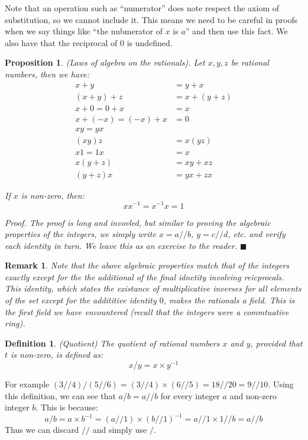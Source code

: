\documentclass{article}
\newtheorem{definition}{Definition}[subsection]
\newtheorem{remark}{Remark}[subsection]
\newtheorem{proposition}{Proposition}[subsection]
\let\it\textit
\begin{document}
Note that an operation such as ``numerator'' does note respect
the axiom of substitution, so we cannot include it. This 
means we need to be careful in proofs when we say things like
``the nubmerator of $x$ is $a$'' and then use this fact. We 
also have that the reciprocal of $0$ is undefined. 

\begin{proposition}
	(Laws of algebra on the rationals). Let $x,y,z$ be 
	rational numbers, then we have:
	\begin{align*}
		x + y &= y + x \\
		(x+y) + z &= x + (y+z) \\
		x + 0 = 0 + x &= x \\
		x + (-x) = (-x) + x &= 0 \\
		xy = yx \\
		(xy)z &= x(yz) \\
		x1 = 1x &= x \\
		x(y+z) &= xy + xz \\
		(y+z)x &= yx + zx	
	\end{align*}

	If $x$ is non-zero, then: 
	$$
	xx^{-1} = x^{-1}x = 1
	$$

	\it{Proof}. The proof is long and invovled, but similar 
	to proving the algebraic properties of the integers,
	we simply write $x = a//b$, $y = c//d$, etc. and 
	verify each identity in turn. We leave this as 
	an exercise to the reader. \hfill $\blacksquare$
\end{proposition}

\begin{remark}
	Note that the above algebraic properties match that of
	the integers exactly except for the the additional 
	of the final idnetity involving reicprocals. This identity,
	which states the existance of multiplicative inverses for 
	all elements of the set except for the addititive identity $0$, 
	makes the rationals a \it{field}. This is the first field
	we have encountered (recall that the integers were a 
	commtuative ring).
\end{remark}

\begin{definition}
	(Quotient) The quotient of rational numbers $x$ and $y$, 
	provided that $t$ is non-zero, is defined as: 
	$$
	x / y = x \times y^{-1}
	$$
\end{definition}

For example $(3//4)/(5//6) = (3//4) \times (6//5) = 18//20 = 9//10$. 
Using this definition, we can see that $a/b = a//b$ for every 
integer $a$ and non-zero integer $b$. This is because:
$$
a/b = a \times b^{-1}= (a//1) \times (b//1)^{-1} = a//1 \times 1//b = a//b
$$
Thus we can discard $//$  and simply use $/$.
\end{document}
